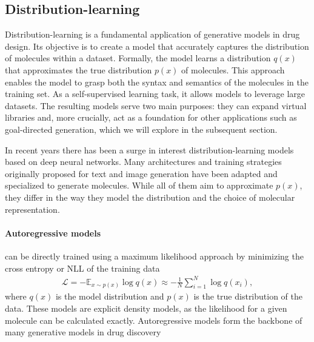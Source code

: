 \subsection{Distribution-learning}
Distribution-learning is a fundamental application of generative models in drug design. Its
objective is to create a model that accurately captures the distribution of molecules within a
dataset. Formally, the model learns a distribution $q(x)$ that approximates the true distribution
$p(x)$ of molecules. This approach enables the model to grasp both the syntax and semantics of the
molecules in the training set. As a self-supervised learning task, it allows models to leverage
large datasets. The resulting models serve two main purposes: they can expand virtual libraries and,
more crucially, act as a foundation for other applications such as goal-directed generation, which
we will explore in the subsequent section.

In recent years there has been a surge in interest distribution-learning models based on deep neural
networks. Many architectures and training strategies originally proposed for text and image
generation have been adapted and specialized to generate molecules. While all of them aim to
approximate $p(x)$, they differ in the way they model the distribution and the choice of molecular
representation.

\paragraph{Autoregressive models} can be directly trained using a maximum likelihood approach by
minimizing the cross entropy or \ac{NLL} of the training data
\begin{align}
      \mathcal{L} = - \mathbb{E}_{x \sim p(x)} \log q(x) \approx - \frac{1}{N} \sum_{i=1}^N \log q(x_i),
\end{align}
where $q(x)$ is the model distribution and $p(x)$ is the true distribution of the data. These models
are explicit density models, as the likelihood for a given molecule can be calculated exactly.
Autoregressive models form the backbone of many generative models in drug discovery
\citep{gomez-bombarelliAutomaticChemicalDesign2018,seglerGeneratingFocusedMolecule2018,olivecronaMolecularDenovoDesign2017,guoAugmentedMemoryCapitalizing2023,thomasAugmentedHillClimbIncreases2022,jaquesSequenceTutorConservative2016,cohen-karlikOvercomingOrderAutoregressive2024,}

